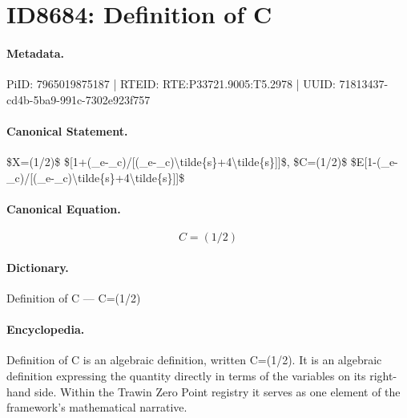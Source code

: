 \section*{ID8684: Definition of C}
\paragraph{Metadata.}
PiID: 7965019875187 | RTEID: RTE:P33721.9005:T5.2978 | UUID: 71813437-cd4b-5ba9-991c-7302e923f757

\paragraph{Canonical Statement.}
\$X=(1/2)\$ \$[1+(\_e-\_c)/[(\_e-\_c)\textbackslash{}tilde\{s\}+4\textbackslash{}tilde\{s\}]]\$, \$C=(1/2)\$ \$E[1-(\_e-\_c)/[(\_e-\_c)\textbackslash{}tilde\{s\}+4\textbackslash{}tilde\{s\}]]\$

\paragraph{Canonical Equation.}
\[
C=(1/2)
\]

\paragraph{Dictionary.}
Definition of C — C=(1/2)

\paragraph{Encyclopedia.}
Definition of C is an algebraic definition, written C=(1/2). It is an algebraic definition expressing the quantity directly in terms of the variables on its right-hand side. Within the Trawin Zero Point registry it serves as one element of the framework's mathematical narrative.
